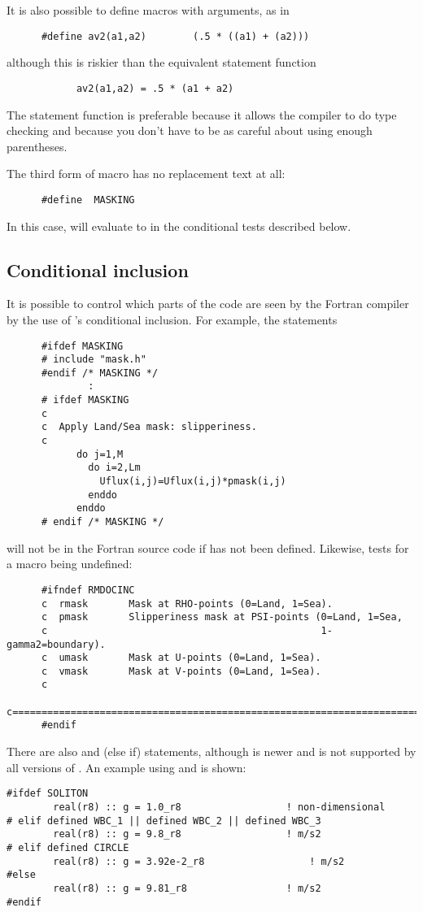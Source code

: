 It is also possible to define macros with arguments, as in
\begin{verbatim}
      #define av2(a1,a2)        (.5 * ((a1) + (a2)))
\end{verbatim}
although this is riskier than the equivalent statement function
\begin{verbatim}
            av2(a1,a2) = .5 * (a1 + a2)
\end{verbatim}
The statement function is preferable because it allows the compiler
to do type checking and because you don't have to be as careful
about using enough parentheses.

The third form of macro has no replacement text at all:
\begin{verbatim}
      #define  MASKING
\end{verbatim}
In this case,  will evaluate to  in the
conditional tests described below.

\subsection{Conditional inclusion}
It is possible to control which parts of the code are seen by the
Fortran compiler by the use of 's conditional inclusion.
For example, the statements
\begin{verbatim}
      #ifdef MASKING
      # include "mask.h"
      #endif /* MASKING */
              :
      # ifdef MASKING
      c
      c  Apply Land/Sea mask: slipperiness.
      c
            do j=1,M
              do i=2,Lm
                Uflux(i,j)=Uflux(i,j)*pmask(i,j)
              enddo
            enddo
      # endif /* MASKING */
\end{verbatim}
will not be in the Fortran source code if  has not
been defined.  Likewise,
 tests for a macro being undefined:
\begin{verbatim}
      #ifndef RMDOCINC
      c  rmask       Mask at RHO-points (0=Land, 1=Sea).
      c  pmask       Slipperiness mask at PSI-points (0=Land, 1=Sea,
      c                                               1-gamma2=boundary).
      c  umask       Mask at U-points (0=Land, 1=Sea).
      c  vmask       Mask at V-points (0=Land, 1=Sea).
      c
      c=======================================================================
      #endif
\end{verbatim}

There are also  and  (else if) statements,
although  is newer and is not supported by all versions of
.  An example using  and  is
shown:
\begin{verbatim}
#ifdef SOLITON
        real(r8) :: g = 1.0_r8                  ! non-dimensional
# elif defined WBC_1 || defined WBC_2 || defined WBC_3
        real(r8) :: g = 9.8_r8                  ! m/s2
# elif defined CIRCLE
        real(r8) :: g = 3.92e-2_r8                  ! m/s2
#else
        real(r8) :: g = 9.81_r8                 ! m/s2
#endif
\end{verbatim}

